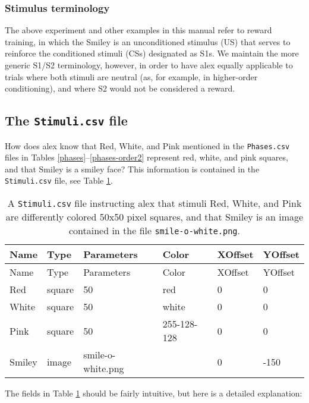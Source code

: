 \documentclass[11pt,]{article}
\begin{document}
\subsubsection{Stimulus terminology}\label{stimulus-terminology}

The above experiment and other examples in this manual refer to reward
training, in which the Smiley is an unconditioned stimulus (US) that
serves to reinforce the conditioned stimuli (CSs) designated as S1s. We
maintain the more generic S1/S2 terminology, however, in order to have
alex equally applicable to trials where both stimuli are neutral (as,
for example, in higher-order conditioning), and where S2 would not be
considered a reward.

\subsection{The \texttt{Stimuli.csv} file}\label{the-stimuli.csv-file}

How does alex know that Red, White, and Pink mentioned in the
\texttt{Phases.csv} files in Tables \ref{phases}--\ref{phases-order2}
represent red, white, and pink squares, and that Smiley is a smiley
face? This information is contained in the \texttt{Stimuli.csv} file,
see Table \ref{stimuli}.

\begin{longtable}[c]{@{}llllll@{}}
\caption{A \texttt{Stimuli.csv} file instructing alex that stimuli Red,
White, and Pink are differently colored 50x50 pixel squares, and that
Smiley is an image contained in the file \texttt{smile-o-white.png}.
\label{stimuli}}\tabularnewline
\toprule
Name & Type & Parameters & Color & XOffset & YOffset\tabularnewline
\midrule
\endfirsthead
\toprule
Name & Type & Parameters & Color & XOffset & YOffset\tabularnewline
\midrule
\endhead
Red & square & 50 & red & 0 & 0\tabularnewline
White & square & 50 & white & 0 & 0\tabularnewline
Pink & square & 50 & 255-128-128 & 0 & 0\tabularnewline
Smiley & image & smile-o-white.png & & 0 & -150\tabularnewline
\bottomrule
\end{longtable}

The fields in Table \ref{stimuli} should be fairly intuitive, but here
is a detailed explanation:
\end{document}

